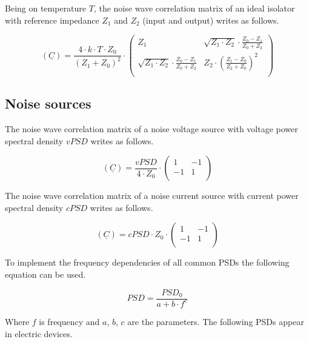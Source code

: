 Being on temperature $T$, the noise wave correlation matrix of an
ideal isolator with reference impedance $Z_1$ and $Z_2$ (input and
output) writes as follows.

\begin{equation}
(\underline{C}) = \frac{4\cdot k\cdot T\cdot Z_0}{(Z_1+Z_0)^2}\cdot
\begin{pmatrix}
  Z_1           & \sqrt{Z_1\cdot Z_2}\cdot\frac{Z_0-Z_1}{Z_0+Z_2}\\
  \sqrt{Z_1\cdot Z_2}\cdot\frac{Z_0-Z_1}{Z_0+Z_2} & Z_2\cdot\left(\frac{Z_1-Z_0}{Z_2+Z_0}\right)^2\\
\end{pmatrix}
\end{equation}


\subsection{Noise sources}

The noise wave correlation matrix of a noise voltage source with
voltage power spectral density $vPSD$ writes as follows.

\begin{equation}
(\underline{C}) = \frac{vPSD}{4\cdot Z_0}\cdot
\begin{pmatrix}
   1 & -1\\
  -1 &  1\\
\end{pmatrix}
\end{equation}

The noise wave correlation matrix of a noise current source with
current power spectral density $cPSD$ writes as follows.

\begin{equation}
(\underline{C}) = cPSD\cdot Z_0\cdot
\begin{pmatrix}
   1 & -1\\
  -1 &  1\\
\end{pmatrix}
\end{equation}

To implement the frequency dependencies of all common PSDs the
following equation can be used.

\begin{equation}
PSD = \frac{PSD_0}{a+b\cdot f^c}
\end{equation}

Where $f$ is frequency and $a$, $b$, $c$ are the parameters.  The
following PSDs appear in electric devices.

